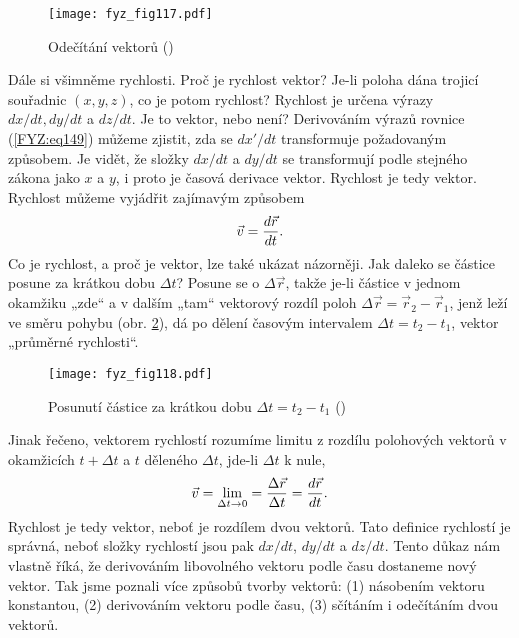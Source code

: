     \begin{figure}[ht!]  %
      \centering
      \texttt{[image: fyz\_fig117.pdf]}
      \caption{Odečítání vektorů
              (\cite[s.~161]{Feynman01})}
      \label{fyz:fig117}
    \end{figure}
    Dále si všimněme rychlosti. Proč je rychlost vektor? Je-li poloha dána trojicí souřadnic 
    \((x,y, z)\), co je potom rychlost? Rychlost je určena výrazy \(dx/dt, dy/dt\) a \(dz/dt\). Je 
    to vektor, nebo není? Derivováním výrazů rovnice (\ref{FYZ:eq149}) můžeme zjistit, zda se 
    \(dx'/dt\) transformuje požadovaným způsobem. Je vidět, že složky \(dx/dt\) a \(dy/dt\) se 
    transformují podle stejného zákona jako \(x\) a \(y\), i proto je časová derivace vektor. 
    Rychlost je tedy vektor. Rychlost můžeme vyjádřit zajímavým způsobem
    \begin{equation*}
      \vec{v} = \dfrac{d \vec{r}}{d t}.
    \end{equation*}    
    Co je rychlost, a proč je vektor, lze také ukázat názorněji. Jak daleko se částice posune za 
    krátkou dobu \(\Delta t\)? Posune se o \(\Delta\vec{r}\), takže je-li částice v jednom okamžiku 
    „zde“ a v dalším „tam“ vektorový rozdíl poloh \(\Delta\vec{r} = \vec{r}_2 - \vec{r}_1\), jenž 
    leží ve směru pohybu (obr. \ref{fyz:fig118}), dá po dělení časovým intervalem \(\Delta t = t_2 
    - t_1\), vektor „průměrné rychlosti“.

    \begin{figure}[ht!]  %
      \centering
      \texttt{[image: fyz\_fig118.pdf]}
      \caption{Posunutí částice za krátkou dobu \(\Delta t = t_2 - t_1\)
              (\cite[s.~162]{Feynman01})}
      \label{fyz:fig118}
    \end{figure}
    Jinak řečeno, vektorem rychlostí rozumíme limitu z rozdílu polohových vektorů v okamžicích \(t 
    + \Delta t\) a \(t\) děleného \(\Delta t\), jde-li \(\Delta t\) k nule,
    \begin{equation}\label{FYZ:eq154}
      \vec{v} = \lim\limits_{\Delta t\to0} = \frac{\Delta\vec{r}}{\Delta t}
              = \dfrac{d \vec{r}}{d t}.
    \end{equation}
    Rychlost je tedy vektor, neboť je rozdílem dvou vektorů. Tato definice rychlostí je správná, 
    neboť složky rychlostí jsou pak \(dx/dt\), \(dy/dt\) a \(dz/dt\). Tento důkaz nám vlastně říká, 
    že derivováním libovolného vektoru podle času dostaneme nový vektor. Tak jsme poznali více 
    způsobů tvorby vektorů: (1) násobením vektoru konstantou, (2) derivováním vektoru podle času, 
    (3) sčítáním i odečítáním dvou vektorů. 

